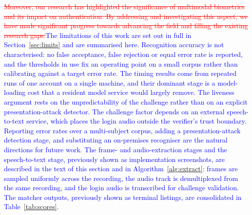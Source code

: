 \documentclass[10pt,journal,compsoc]{IEEEtran}
\begin{document}
\textcolor{red}{\sout{Moreover, our research has highlighted the significance of multimodal biometrics and its impact on authentication. By addressing and investigating this aspect, we have made significant progress towards advancing the field and filling the existing research gaps.}}\textcolor{blue}{The limitations of this work are set out in full in Section~\ref{sec:limits} and are summarised here. Recognition accuracy is not characterised: no false acceptance, false rejection or equal error rate is reported, and the thresholds in use fix an operating point on a small corpus rather than calibrating against a target error rate. The timing results come from repeated runs of one account on a single machine, and their dominant stage is a model-loading cost that a resident model service would largely remove. The liveness argument rests on the unpredictability of the challenge rather than on an explicit presentation-attack detector. The challenge factor depends on an external speech-to-text service, which places the login audio outside the verifier's trust boundary. Reporting error rates over a multi-subject corpus, adding a presentation-attack detection stage, and substituting an on-premises recogniser are the natural directions for future work.}
\textcolor{blue}{The frame- and audio-extraction stages and the speech-to-text stage, previously shown as implementation screenshots, are described in the text of this section and in Algorithm~\ref{alg:extract}: frames are sampled uniformly across the recording, the audio track is demultiplexed from the same recording, and the login audio is transcribed for challenge validation. The matcher outputs, previously shown as terminal listings, are consolidated in Table~\ref{tab:scores}.}
\end{document}
